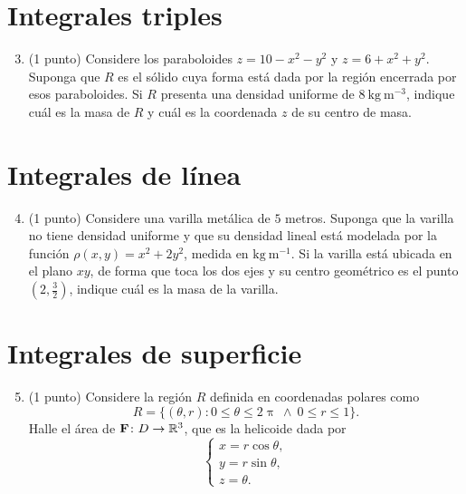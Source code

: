 \documentclass{fmbvecto}
\begin{document}
\section{Integrales triples}

    \begin{enumerate}
        \setcounter{enumi}{2}
        \item (1 punto) Considere los paraboloides \(z = 10 - x^2 - y^2\) y \(z = 6 + x^2 + y^2\). Suponga que \(R\) es el sólido cuya forma está dada por la región encerrada por esos paraboloides. Si \(R\) presenta una densidad uniforme de \(8 \: \text{kg} \: \text{m}^{-3}\), indique cuál es la masa de \(R\) y cuál es la coordenada \(z\) de su centro de masa.
    \end{enumerate}

\section{Integrales de línea}

    \begin{enumerate}
        \setcounter{enumi}{3}
        \item (1 punto) Considere una varilla metálica de \(5\) metros. Suponga que la varilla no tiene densidad uniforme y que su densidad lineal está modelada por la función \(\rho(x, y) = x^2 + 2y^2\), medida en \(\text{kg} \: \text{m}^{-1}\). Si la varilla está ubicada en el plano \(xy\), de forma que toca los dos ejes y su centro geométrico es el punto \((2, \frac{3}{2})\), indique cuál es la masa de la varilla.
    \end{enumerate}


\section{Integrales de superficie}
    
    \begin{enumerate}
        \setcounter{enumi}{4}
        \item (1 punto) Considere la región \(R\) definida en coordenadas polares como \[R = \{(\theta, r) \colon 0 \leq \theta \leq 2\uppi \ \land \ 0 \leq r \leq 1\}.\] Halle el área de \(\boldsymbol{{\mathbf{F}}}\colon D\to \mathbb{R}^3\), que es la helicoide dada por \[\begin{cases}
            x = r\cos\theta, \\
            y = r\sin\theta, \\
            z = \theta.
        \end{cases}\]
    \end{enumerate}
\end{document}

